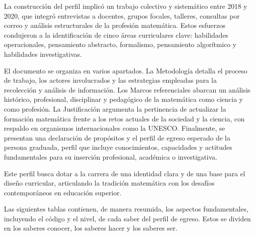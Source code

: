 La construcción del perfil implicó un trabajo colectivo y sistemático entre 2018 y 2020, que integró entrevistas a docentes, grupos focales, talleres, consultas por correo y análisis estructurales de la profesión matemática. Estos esfuerzos condujeron a la identificación de cinco áreas curriculares clave: habilidades operacionales, pensamiento abstracto, formalismo, pensamiento algorítmico y habilidades investigativas.

El documento se organiza en varios apartados. La Metodología detalla el proceso de trabajo, los actores involucrados y las estrategias empleadas para la recolección y análisis de información. Los Marcos referenciales abarcan un análisis histórico, profesional, disciplinar y pedagógico de la matemática como ciencia y como profesión. La Justificación argumenta la pertinencia de actualizar la formación matemática frente a los retos actuales de la sociedad y la ciencia, con respaldo en organismos internacionales como la UNESCO. Finalmente, se presentan una declaración de propósitos y el perfil de egreso esperado de la persona graduada, perfil que incluye conocimientos, capacidades y actitudes fundamentales para su inserción profesional, académica o investigativa.

Este perfil busca dotar a la carrera de una identidad clara y de una base para el diseño curricular, articulando la tradición matemática con los desafíos contemporáneos en educación superior.

Las siguientes tablas contienen, de manera resumida, los aspectos fundamentales, incluyendo el código y el nivel, de cada saber del perfil de egreso. Estos se dividen en los saberes conocer, los saberes hacer y los saberes ser.


